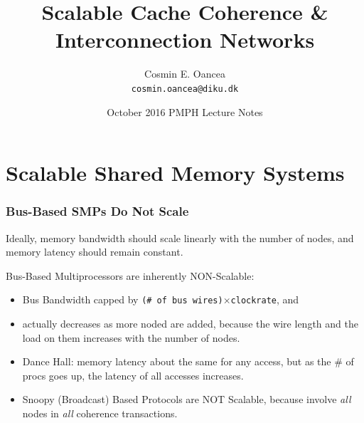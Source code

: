 \documentclass{beamer}
\title[Interconnect]{Scalable Cache Coherence \&\\Interconnection Networks}
\author[C.~Oancea]{Cosmin E. Oancea\\{\tt cosmin.oancea@diku.dk}}
\institute{Department of Computer Science (DIKU)\\University of Copenhagen}
\date[Oct 2016]{October 2016 PMPH Lecture Notes}
\renewcommand{\emph}[1]{\textcolor{structure}{#1}}
\newcommand{\emp}[1]{\textcolor{DikuRed}{ #1}}
\begin{document}
\titleslide




\begin{frame}[fragile]
	\tableofcontents
\end{frame}


\section{Scalable Shared Memory Systems}

\begin{frame}[fragile,t]
\frametitle{Bus-Based SMPs Do Not Scale}

\emph{Ideally, memory bandwidth should scale linearly with the number of nodes,
and memory latency should remain constant}.\bigskip

\alert{Bus-Based Multiprocessors are inherently NON-Scalable}:\medskip
\begin{itemize}
    \item \emp{Bus Bandwidth} capped by {\tt (\# of bus wires)$\times$clockrate}, and
    \item \emp{actually decreases as more noded are added}, 
            because the wire length and the load on them 
            increases with the number of nodes.\bigskip
    \item Dance Hall: memory latency about the same for any access,
            but as the \# of procs goes up, the latency of all
            accesses increases.\bigskip\pause
    \item \emp{Snoopy (Broadcast) Based Protocols are NOT Scalable},
            because involve {\em all} nodes in {\em all} coherence transactions. 
\end  {itemize}
\end{frame}
\end{document}
